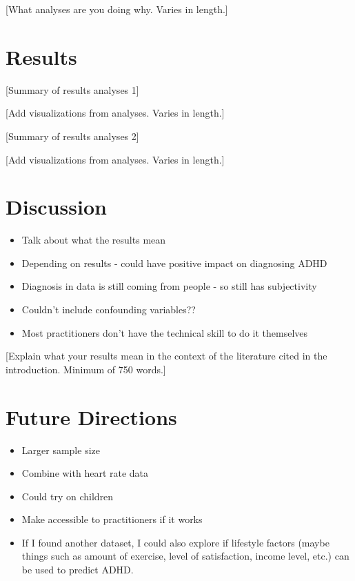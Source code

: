 \documentclass[,article,submit,moreauthors,pdftex]{mdpi}
\providecommand{\tightlist}{%
  \setlength{\itemsep}{0pt}\setlength{\parskip}{0pt}}
\begin{document}
{[}What analyses are you doing why. Varies in length.{]}

\hypertarget{results}{%
\section{Results}\label{results}}

{[}Summary of results analyses 1{]}

{[}Add visualizations from analyses. Varies in length.{]}

{[}Summary of results analyses 2{]}

{[}Add visualizations from analyses. Varies in length.{]}

\hypertarget{discussion}{%
\section{Discussion}\label{discussion}}

\begin{itemize}
\tightlist
\item
  Talk about what the results mean
\item
  Depending on results - could have positive impact on diagnosing ADHD
\item
  Diagnosis in data is still coming from people - so still has
  subjectivity
\item
  Couldn't include confounding variables??
\item
  Most practitioners don't have the technical skill to do it themselves
\end{itemize}

{[}Explain what your results mean in the context of the literature cited
in the introduction. Minimum of 750 words.{]}

\hypertarget{future-directions}{%
\section{Future Directions}\label{future-directions}}

\begin{itemize}
\tightlist
\item
  Larger sample size
\item
  Combine with heart rate data
\item
  Could try on children
\item
  Make accessible to practitioners if it works
\item
  If I found another dataset, I could also explore if lifestyle factors
  (maybe things such as amount of exercise, level of satisfaction,
  income level, etc.) can be used to predict ADHD.
\end{itemize}
\end{document}
